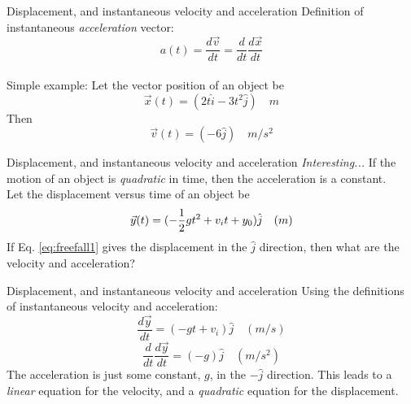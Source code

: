 \documentclass{beamer}
\begin{document}
\begin{frame}{Displacement, and instantaneous velocity and acceleration}
Definition of instantaneous \textit{acceleration} vector:
\begin{equation}
\boxed{a(t) = \frac{d\vec{v}}{dt} = \frac{d}{dt} \frac{d\vec{x}}{dt}}
\end{equation} \\
\vspace{0.5cm}
Simple example: Let the vector position of an object be
\begin{equation}
\vec{x}(t) = (2t \hat{i} - 3t^2\hat{j}) \quad m
\end{equation}
Then
\begin{equation}
\vec{v}(t) = (-6\hat{j}) \quad m/s^2
\end{equation}
\end{frame}

\begin{frame}{Displacement, and instantaneous velocity and acceleration}
\textit{Interesting...} If the motion of an object is \textit{quadratic} in time, then the acceleration is a constant. \\
\vspace{0.2cm}
Let the displacement versus time of an object be \\
\begin{equation}
\vec{y}(t) = (-\frac{1}{2}gt^2 + v_{i}t + y_{\rm 0}) \hat{j} \quad (m)
\label{eq:freefall1}
\end{equation}
If Eq. \ref{eq:freefall1} gives the displacement in the $\hat{j}$ direction, then what are the velocity and acceleration?
\end{frame}

\begin{frame}{Displacement, and instantaneous velocity and acceleration}
Using the definitions of instantaneous velocity and acceleration: \\
\begin{equation}
\frac{d\vec{y}}{dt} = (-gt + v_{i}) \hat{j} \quad (m/s)
\label{eq:freefall2}
\end{equation}
\begin{equation}
\frac{d}{dt}\frac{d\vec{y}}{dt} = (-g) \hat{j} \quad (m/s^2)
\label{eq:freefall3}
\end{equation}
The acceleration is just some constant, $g$, in the $-\hat{j}$ direction.  This leads to a \textit{linear} equation for the velocity, and a \textit{quadratic} equation for the displacement.
\end{frame}
\end{document}
